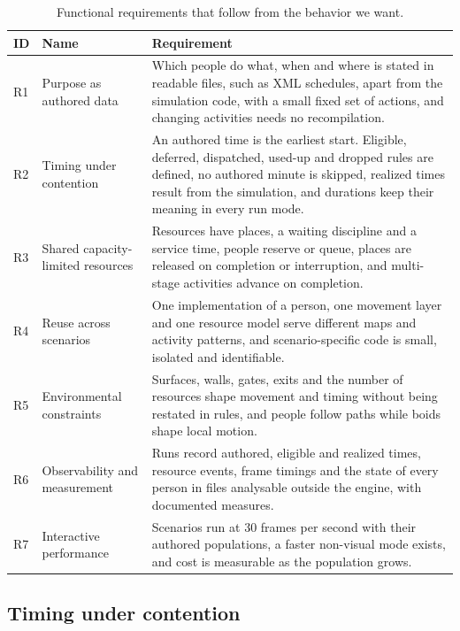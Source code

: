 \begin{table}[H]
\centering
\small
\renewcommand{\arraystretch}{1.1}
\begin{tabular}{|L{0.05\textwidth}|L{0.22\textwidth}|L{0.66\textwidth}|}
\hline
{}\textbf{ID} & \textbf{Name} & \textbf{Requirement} \\
\hline
R1 & Purpose as authored data & Which people do what, when and where is stated in readable files, such as XML schedules, apart from the simulation code, with a small fixed set of actions, and changing activities needs no recompilation. \\ \hline
R2 & Timing under contention & An authored time is the earliest start. Eligible, deferred, dispatched, used-up and dropped rules are defined, no authored minute is skipped, realized times result from the simulation, and durations keep their meaning in every run mode. \\ \hline
R3 & Shared capacity-limited resources & Resources have places, a waiting discipline and a service time, people reserve or queue, places are released on completion or interruption, and multi-stage activities advance on completion. \\ \hline
R4 & Reuse across scenarios & One implementation of a person, one movement layer and one resource model serve different maps and activity patterns, and scenario-specific code is small, isolated and identifiable. \\ \hline
R5 & Environmental constraints & Surfaces, walls, gates, exits and the number of resources shape movement and timing without being restated in rules, and people follow paths while boids shape local motion. \\ \hline
R6 & Observability and measurement & Runs record authored, eligible and realized times, resource events, frame timings and the state of every person in files analysable outside the engine, with documented measures. \\ \hline
R7 & Interactive performance & Scenarios run at 30 frames per second with their authored populations, a faster non-visual mode exists, and cost is measurable as the population grows. \\ \hline
\end{tabular}
\caption[Functional requirements]{Functional requirements that follow from the behavior we want.}
\label{tab:requirements}
\end{table}

\subsection{Timing under contention}\label{sub:challenge-timing}

